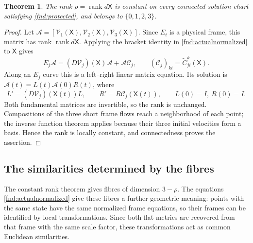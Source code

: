 \documentclass[11pt,a4paper]{article}
\numberwithin{equation}{section}
\theoremstyle{plain}
\newtheorem{theorem}{Theorem}[section]
\theoremstyle{definition}
\theoremstyle{remark}
\begin{document}
\begin{theorem}\label{fnd:rankconstant}
The rank $\rho=\operatorname{rank}d\mathsf X$ is constant on every connected solution chart satisfying \eqref{fnd:protected}, and belongs to $\{0,1,2,3\}$.
\end{theorem}
\begin{proof}
Let $\mathscr A=[\mathcal V_1(\mathsf X),\mathcal V_2(\mathsf X),\mathcal V_3(\mathsf X)]$. Since $E_i$ is a physical frame, this matrix has rank $\operatorname{rank}d\mathsf X$. Applying the bracket identity in \eqref{fnd:actualnormalized} to $\mathsf X$ gives
\[
E_j\mathscr A=(D\mathcal V_j)(\mathsf X)\mathscr A+\mathscr A\mathscr C_j,
\qquad (\mathscr C_j)_{ki}=\widetilde C^k_{ji}(\mathsf X).
\]
Along an $E_j$ curve this is a left--right linear matrix equation. Its solution is $\mathscr A(t)=L(t)\mathscr A(0)R(t)$, where
\[
L'=(D\mathcal V_j)(\mathsf X(t))L,\qquad R'=R\mathscr C_j(\mathsf X(t)),\qquad L(0)=I,\ R(0)=I.
\]
Both fundamental matrices are invertible, so the rank is unchanged. Compositions of the three short frame flows reach a neighborhood of each point; the inverse function theorem applies because their three initial velocities form a basis. Hence the rank is locally constant, and connectedness proves the assertion.
\end{proof}

\subsection{The similarities determined by the fibres}
The constant rank theorem gives fibres of dimension $3-\rho$.
The equations \eqref{fnd:actualnormalized} give these fibres a further
geometric meaning: points with the same state have the same normalized
frame equations, so their frames can be identified by local
transformations. Since both flat metrics are recovered from that frame
with the same scale factor, these transformations act as common
Euclidean similarities.
\end{document}
